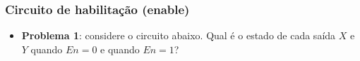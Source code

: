 \documentclass{beamer}
\begin{document}
\begin{frame}
\frametitle{Circuito de habilitação (enable)}

\begin{itemize}
\item \textbf{Problema 1}: considere o circuito abaixo. Qual é o estado
de cada saída $X$ e $Y$ quando $En = 0$ e quando $En = 1$?

\vspace{12pt}

\begin{center}
%
%
%

\end{center}
\end{itemize}
\end{frame}
\end{document}
